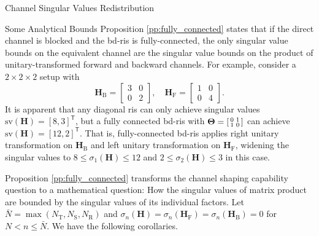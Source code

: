 \documentclass[journal]{IEEEtran}
\begin{document}
\begin{section}{Channel Singular Values Redistribution}
\begin{subsection}{Some Analytical Bounds}
		Proposition \ref{pp:fully_connected} states that if the direct channel is blocked and the \gls{bd}-\gls{ris} is fully-connected, the only singular value bounds on the equivalent channel are the singular value bounds on the product of unitary-transformed forward and backward channels.
		For example, consider a $2 \times 2 \times 2$ setup with
		\begin{equation*}
			\mathbf{H}_\mathrm{B} =
				\begin{bmatrix}
					3 & 0 \\
					0 & 2
				\end{bmatrix},
				\quad
				\mathbf{H}_\mathrm{F} =
				\begin{bmatrix}
					1 & 0 \\
					0 & 4
				\end{bmatrix}.
		\end{equation*}
		It is apparent that any diagonal \gls{ris} can only achieve singular values $\mathrm{sv}(\mathbf{H}) = [8, 3]^\mathsf{T}$, but a fully connected \gls{bd}-\gls{ris} with $\mathbf{\Theta} = \begin{bsmallmatrix} 0 & 1 \\ 1 & 0 \end{bsmallmatrix}$ can achieve $\mathrm{sv}(\mathbf{H}) = [12, 2]^\mathsf{T}$.
		That is, fully-connected \gls{bd}-\gls{ris} applies right unitary transformation on $\mathbf{H}_\mathrm{B}$ and left unitary transformation on $\mathbf{H}_\mathrm{F}$, widening the singular values to $8 \le \sigma_1(\mathbf{H}) \le 12$ and $2 \le \sigma_2(\mathbf{H}) \le 3$ in this case.

		Proposition \ref{pp:fully_connected} transforms the channel shaping capability question to a mathematical question: How the singular values of matrix product are bounded by the singular values of its individual factors.
		Let $\bar{N} = \max(N_\mathrm{T},N_\mathrm{S},N_\mathrm{R})$ and $\sigma_n(\mathbf{H})=\sigma_n(\mathbf{H}_\mathrm{F})=\sigma_n(\mathbf{H}_\mathrm{B})=0$ for $N < n \le \bar{N}$.
		We have the following corollaries.


\end{subsection}
\end{section}
\end{document}
